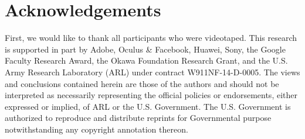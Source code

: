 \section{Acknowledgements}

First, we would like to thank all participants who were videotaped. This research is supported in part by Adobe, Oculus \& Facebook, Huawei, Sony, the Google Faculty Research Award, the Okawa Foundation Research Grant, and the U.S. Army Research Laboratory (ARL) under contract W911NF-14-D-0005. The views and conclusions contained herein are those of the authors and should not be interpreted as necessarily representing the official policies or endorsements, either expressed or implied, of ARL or the U.S. Government. The U.S. Government is authorized to reproduce and distribute reprints for Governmental purpose notwithstanding any copyright annotation thereon. 


